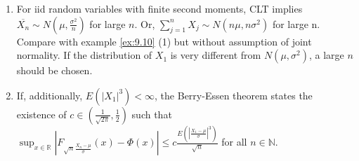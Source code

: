 \documentclass{article}
\newcommand{\R}{\mathbb{R}}
\newcommand{\N}{\mathbb{N}}
\begin{document}
			\begin{myrem}{}{}
				\begin{enumerate}
					\item For iid random variables with finite second moments, CLT implies $\overline{X_n}\sim N(\mu, \frac{\sigma^2}{n})$ for large $n$. Or, $\sum_{j=1}^nX_j\sim N(n\mu, n\sigma^2)$ for large n. Compare with example \ref{ex:9.10} (1) but without assumption of joint normality. If the distribution of $X_1$ is very different from $N(\mu, \sigma^2)$, a large $n$ should be chosen.
					
					\item If, additionally, $E(|X_1|^3)<\infty$, the Berry-Essen theorem states the existence of $c\in(\frac{1}{\sqrt{2\pi}}, \frac{1}{2})$ such that $\sup_{x\in\R}|F_{\sqrt{n}\frac{\overline{X_n}-\mu}{\sigma}}(x)-\Phi(x)|\leq c\frac{E(|\frac{X_1-\mu}{\sigma}|^3)}{\sqrt{n}}$ for all $n\in\N$.
				\end{enumerate}
			\end{myrem}
			
\end{document}

